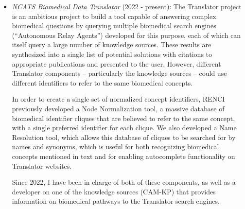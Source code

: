 \begin{itemize}

\item \textit{NCATS Biomedical Data Translator} (2022 - present): The Translator project is an ambitious project to build a tool capable of answering complex biomedical questions by querying multiple biomedical search engines (``Autonomous Relay Agents'') developed for this purpose, each of which can itself query a large number of knowledge sources. These results are synthesized into a single list of potential solutions with citations to appropriate publications and presented to the user. However, different Translator components -- particularly the knowledge sources -- could use different identifiers to refer to the same biomedical concepts.

In order to create a single set of normalized concept identifiers, RENCI previously developed a Node Normalization tool, a massive database of biomedical identifier cliques that are believed to refer to the same concept, with a single preferred identifier for each clique. We also developed a Name Resolution tool, which allows this database of cliques to be searched for by names and synonyms, which is useful for both recognizing biomedical concepts mentioned in text and for enabling autocomplete functionality on Translator websites.

Since 2022, I have been in charge of both of these components, as well as a developer on one of the knowledge sources (CAM-KP) that provides information on biomedical pathways to the Translator search engines.

\begin{products}






\end{products}
\end{itemize}
